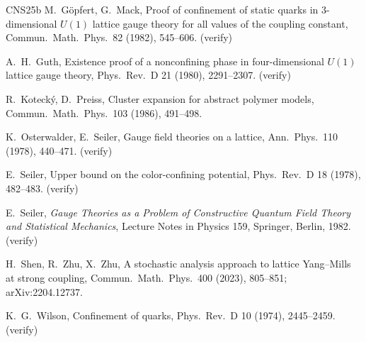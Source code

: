 \documentclass[11pt,a4paper]{article}
\theoremstyle{definition}
\theoremstyle{remark}
\begin{document}
\begin{thebibliography}{CNS25b}
M.~Göpfert, G.~Mack, Proof of confinement of static quarks in $3$-dimensional $U(1)$ lattice gauge theory for all values
of the coupling constant, Commun.\ Math.\ Phys.\ 82 (1982), 545--606. (verify)

A.~H.~Guth, Existence proof of a nonconfining phase in four-dimensional $U(1)$ lattice gauge theory, Phys.\ Rev.\ D 21
(1980), 2291--2307. (verify)

R.~Kotecký, D.~Preiss, Cluster expansion for abstract polymer models, Commun.\ Math.\ Phys.\ 103 (1986), 491--498.

K.~Osterwalder, E.~Seiler, Gauge field theories on a lattice, Ann.\ Phys.\ 110 (1978), 440--471. (verify)

E.~Seiler, Upper bound on the color-confining potential, Phys.\ Rev.\ D 18 (1978), 482--483. (verify)

E.~Seiler, \emph{Gauge Theories as a Problem of Constructive Quantum Field Theory and Statistical Mechanics},
Lecture Notes in Physics 159, Springer, Berlin, 1982. (verify)

H.~Shen, R.~Zhu, X.~Zhu, A stochastic analysis approach to lattice Yang--Mills at strong coupling,
Commun.\ Math.\ Phys.\ 400 (2023), 805--851; arXiv:2204.12737.

K.~G.~Wilson, Confinement of quarks, Phys.\ Rev.\ D 10 (1974), 2445--2459. (verify)

\end{thebibliography}
\end{document}
